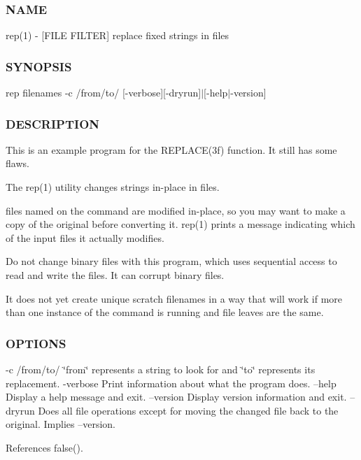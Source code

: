 \subsubsection*{N\+A\+ME}

rep(1) -\/ \mbox{[}F\+I\+LE F\+I\+L\+T\+ER\mbox{]} replace fixed strings in files \subsubsection*{S\+Y\+N\+O\+P\+S\+IS}

rep filenames -\/c /from/to/ \mbox{[}-\/verbose\mbox{]}\mbox{[}-\/dryrun\mbox{]}$\vert$\mbox{[}-\/help$\vert$-\/version\mbox{]}

\subsubsection*{D\+E\+S\+C\+R\+I\+P\+T\+I\+ON}

This is an example program for the R\+E\+P\+L\+A\+C\+E(3f) function. It still has some flaws.

The rep(1) utility changes strings in-\/place in files.

files named on the command are modified in-\/place, so you may want to make a copy of the original before converting it. rep(1) prints a message indicating which of the input files it actually modifies.

Do not change binary files with this program, which uses sequential access to read and write the files. It can corrupt binary files.

It does not yet create unique scratch filenames in a way that will work if more than one instance of the command is running and file leaves are the same. \subsubsection*{O\+P\+T\+I\+O\+NS}

-\/c /from/to/ \char`\"{}from\char`\"{} represents a string to look for and \char`\"{}to\char`\"{} represents its replacement. -\/verbose Print information about what the program does. --help Display a help message and exit. --version Display version information and exit. --dryrun Does all file operations except for moving the changed file back to the original. Implies --version. 

References false().

\mbox{\label{rep_8f90_a6e3f64c6bb01cd2bdc33472e0505a863}} 
